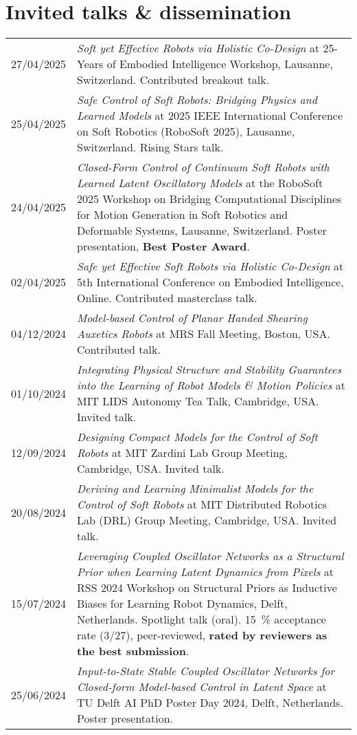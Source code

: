 \section*{Invited talks \& dissemination}
\noindent
\begin{longtable}{p{} p{}}
    27/04/2025 & \emph{Soft yet Effective Robots via Holistic Co-Design} at 25-Years of Embodied Intelligence Workshop, Lausanne, Switzerland. Contributed breakout talk.\\
    25/04/2025 & \emph{Safe Control of Soft Robots: Bridging Physics and Learned Models} at 2025 IEEE International Conference on Soft Robotics (RoboSoft 2025), Lausanne, Switzerland. Rising Stars talk.\\
    24/04/2025 & \emph{Closed-Form Control of Continuum Soft Robots with Learned Latent Oscillatory Models} at the RoboSoft 2025 Workshop on Bridging Computational Disciplines for Motion Generation in Soft Robotics and Deformable Systems, Lausanne, Switzerland. Poster presentation, \textbf{Best Poster Award}.\\
    02/04/2025 & \emph{Safe yet Effective Soft Robots via Holistic Co-Design} at 5th International Conference on Embodied Intelligence, Online. Contributed masterclass talk.\\
    04/12/2024 & \emph{Model-based Control of Planar Handed Shearing Auxetics Robots} at MRS Fall Meeting, Boston, USA. Contributed talk.\\
    01/10/2024 & \emph{Integrating Physical Structure and Stability Guarantees into the Learning of Robot Models \& Motion Policies} at MIT LIDS Autonomy Tea Talk, Cambridge, USA. Invited talk.\\
    12/09/2024 & \emph{Designing Compact Models for the Control of Soft Robots} at MIT Zardini Lab Group Meeting, Cambridge, USA. Invited talk.\\
    20/08/2024 & \emph{Deriving and Learning Minimalist Models for the Control of Soft Robots} at MIT Distributed Robotics Lab (DRL) Group Meeting, Cambridge, USA. Invited talk.\\
    15/07/2024 & \emph{Leveraging Coupled Oscillator Networks as a Structural Prior when Learning Latent Dynamics from Pixels} at RSS 2024 Workshop on Structural Priors as Inductive Biases for
    Learning Robot Dynamics, Delft, Netherlands. Spotlight talk (oral). \SI{15}{\percent} acceptance rate (3/27), peer-reviewed, \textbf{rated by reviewers as the best submission}.\\
    25/06/2024 & \emph{Input-to-State Stable Coupled Oscillator Networks for Closed-form Model-based Control in Latent Space} at TU Delft AI PhD Poster Day 2024, Delft, Netherlands. Poster presentation.\\

\end{longtable}
